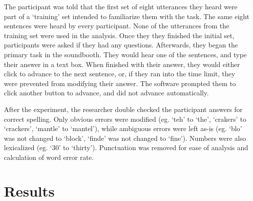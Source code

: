 The participant was told that the first set of eight utterances they heard were part of a `training' set intended to familiarize them with the task. The same eight sentences were heard by every participant.  None of the utterances from the training set were used in the analysis.  Once they they finished the initial set, participants were asked if they had any questions.  Afterwards, they began the primary task in the soundbooth.  They would hear one of the sentences, and type their answer in a text box.  When finished with their answer, they would either click to advance to the next sentence, or, if they ran into the time limit, they were prevented from modifying their answer.  The software prompted them to click another button to advance, and did not advance automatically.

After the experiment, the researcher double checked the participant answers for correct spelling.  Only obvious errors were modified (eg. `teh' to `the', `crakers' to `crackers', `mantle' to `mantel'), while ambiguous errors were left as-is (eg. `blo' was not changed to `block', `finde' was not changed to `fine').  Numbers were also lexicalized (eg. `30' to `thirty').  Punctuation was removed for ease of analysis and calculation of word error rate.


\section{Results}
\label{chap3:results}

